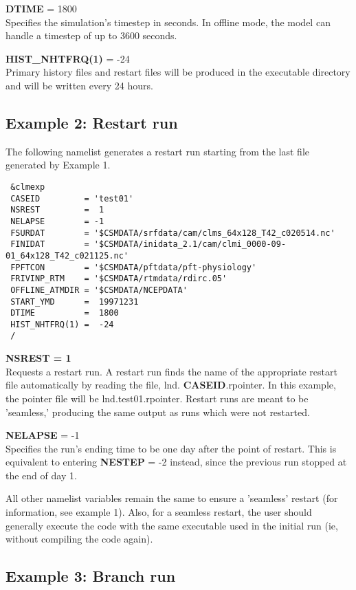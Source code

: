 \medskip \noindent 
{\bf DTIME} = 1800 \\
Specifies the simulation's timestep in seconds. In offline mode, the
model can handle a timestep of up to 3600 seconds.

\medskip \noindent 
{\bf HIST\_NHTFRQ(1)} = -24 \\
Primary history files and restart files will be produced in the
executable directory and will be written every 24 hours.

\subsection {Example 2: Restart run}

\noindent 
The following namelist generates a restart run starting from the last
file generated by Example 1.

\begin{verbatim}
 &clmexp
 CASEID         = 'test01' 
 NSREST         =  1 
 NELAPSE        = -1 
 FSURDAT        = '$CSMDATA/srfdata/cam/clms_64x128_T42_c020514.nc'
 FINIDAT        = '$CSMDATA/inidata_2.1/cam/clmi_0000-09-01_64x128_T42_c021125.nc'
 FPFTCON        = '$CSMDATA/pftdata/pft-physiology' 
 FRIVINP_RTM    = '$CSMDATA/rtmdata/rdirc.05'
 OFFLINE_ATMDIR = '$CSMDATA/NCEPDATA' 
 START_YMD      =  19971231 
 DTIME          =  1800 
 HIST_NHTFRQ(1) =  -24
 / 
\end{verbatim}

\medskip \noindent 
{\bf NSREST = 1} \\
Requests a restart run. A restart run finds the name of the
appropriate restart file automatically by reading the file, lnd.{\bf
CASEID}.rpointer.  In this example, the pointer file will be
lnd.test01.rpointer. Restart runs are meant to be 'seamless,'
producing the same output as runs which were not restarted.

\medskip \noindent 
{\bf NELAPSE} = -1 \\
Specifies the run's ending time to be one day after the point of
restart. This is equivalent to entering {\bf NESTEP} = -2 instead,
since the previous run stopped at the end of day 1.

\medskip \noindent 
All other namelist variables remain the same to ensure a 'seamless'
restart (for information, see example 1). Also, for a seamless
restart, the user should generally execute the code with the same
executable used in the initial run (ie, without compiling the code
again).

\subsection {Example 3: Branch run}

